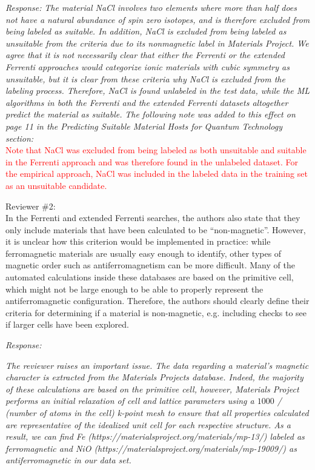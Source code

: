 \documentclass[11pt, a4paper]{letter} %
\newcommand{\mrk}[1]{\textcolor{red}{#1}}
\begin{document}
\textit{Response:} 
\textit{The material NaCl involves two elements where more than half does not have a natural abundance of spin zero isotopes, and is therefore excluded from being labeled as suitable. In addition, NaCl is excluded from being labeled as unsuitable from the criteria due to its nonmagnetic label in Materials Project. We agree that it is not necessarily clear that either the Ferrenti or the extended Ferrenti approaches would categorize ionic materials with cubic symmetry as unsuitable, but it is clear from these criteria why NaCl is excluded from the labeling process. Therefore, NaCl is found unlabeled in the test data, while the ML algorithms in both the Ferrenti and the extended Ferrenti datasets altogether predict the material as suitable.}
\textit{The following note was added to this effect on page 11 in the Predicting Suitable Material Hosts for Quantum Technology section:} \\ 
\mrk{Note that NaCl was excluded from being labeled as both unsuitable and suitable in the Ferrenti approach and was therefore found in the unlabeled dataset. For the empirical approach, NaCl was included in the labeled data in the training set as an unsuitable candidate. }

Reviewer \#2: \\
In the Ferrenti and extended Ferrenti searches, the authors also state that they only include materials that have been calculated to be “non-magnetic”. However, it is unclear how this criterion would be implemented in practice: while ferromagnetic materials are usually easy enough to identify, other types of magnetic order such as antiferromagnetism can be more difficult. Many of the automated calculations inside these databases are based on the primitive cell, which might not be large enough to be able to properly represent the antiferromagnetic configuration. Therefore, the authors should clearly define their criteria for determining if a material is non-magnetic, e.g. including checks to see if larger cells have been explored.

\textit{Response:}

\textit{The reviewer raises an important issue. 
The data regarding a material's magnetic character is extracted from the Materials Projects database. Indeed, the majority of these calculations are based on the primitive cell, however, Materials Project performs an initial relaxation of cell and lattice parameters using a $1000$ / (number of atoms in the cell) k-point mesh to ensure that all properties calculated are representative of the idealized unit cell for each respective structure. As a result, we can find Fe (https://materialsproject.org/materials/mp-13/) labeled as ferromagnetic and NiO (https://materialsproject.org/materials/mp-19009/) as antiferromagnetic in our data set.} 
\end{document}
